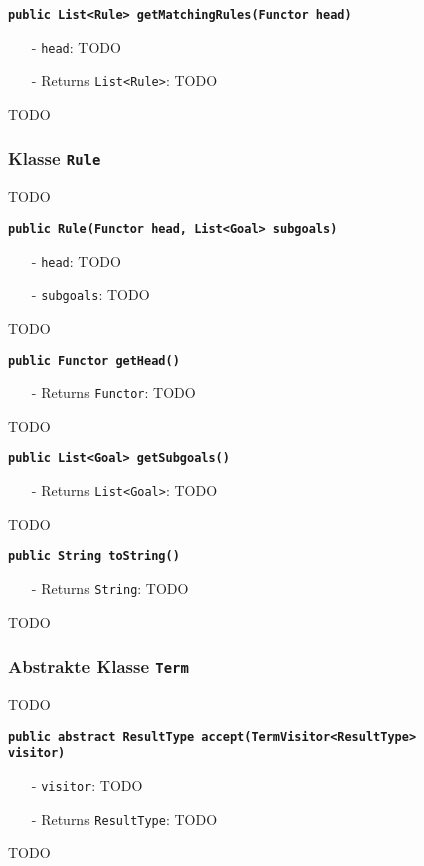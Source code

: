 \documentclass[parskip=full,11pt,twoside]{scrartcl}
\begin{document}
\textbf{\texttt{public List<Rule> getMatchingRules(Functor head)}}
\begin{itemize}[noitemsep]
	\item[-] \texttt{head}: TODO
	\item[-] Returns \texttt{List<Rule>}: TODO
\end{itemize}
TODO

\subsubsection{Klasse \texttt{Rule}}
TODO

\textbf{\texttt{public Rule(Functor head, List<Goal> subgoals)}}
\begin{itemize}[noitemsep]
	\item[-] \texttt{head}: TODO
	\item[-] \texttt{subgoals}: TODO
\end{itemize}
TODO

\textbf{\texttt{public Functor getHead()}}
\begin{itemize}[noitemsep]
	\item[-] Returns \texttt{Functor}: TODO
\end{itemize}
TODO

\textbf{\texttt{public List<Goal> getSubgoals()}}
\begin{itemize}[noitemsep]
	\item[-] Returns \texttt{List<Goal>}: TODO
\end{itemize}
TODO

\textbf{\texttt{public String toString()}}
\begin{itemize}[noitemsep]
	\item[-] Returns \texttt{String}: TODO
\end{itemize}
TODO
\subsubsection{Abstrakte Klasse \texttt{Term}}
TODO

\textbf{\texttt{public abstract ResultType accept(TermVisitor<ResultType>\\visitor)}}
\begin{itemize}[noitemsep]
	\item[-] \texttt{visitor}: TODO
	\item[-] Returns \texttt{ResultType}: TODO
\end{itemize}
TODO
\end{document}
